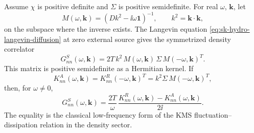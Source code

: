 \begin{theorem}
\label{thm:sk-hydro-density-fdt-from-action}
Assume \(\chi\) is positive definite and \(\Sigma\) is positive semidefinite.
For real \(\omega\), \(\mathbf k\), let
\begin{equation}
  M(\omega,\mathbf k)=
  (Dk^2-\ii\omega\mathbf 1)^{-1},
  \qquad k^2=\mathbf k\cdot\mathbf k ,
  \label{eq:sk-hydro-diffusion-resolvent}
\end{equation}
on the subspace where the inverse exists.  The Langevin equation
\eqref{eq:sk-hydro-langevin-diffusion} at zero external source gives the
symmetrized density correlator
\begin{equation}
  G^{S}_{nn}(\omega,\mathbf k)
  =
  2T\,k^2\,
  M(\omega,\mathbf k)\,
  \Sigma\,
  M(-\omega,\mathbf k)^T .
  \label{eq:sk-hydro-density-symmetrized-correlator}
\end{equation}
This matrix is positive semidefinite as a Hermitian kernel.  If
\begin{equation}
  K^A_{nn}(\omega,\mathbf k)
  =
  K^R_{nn}(-\omega,\mathbf k)^T
  =
  k^2\Sigma\,M(-\omega,\mathbf k)^T ,
  \label{eq:sk-hydro-density-advanced-kernel}
\end{equation}
then, for \(\omega\ne0\),
\begin{equation}
  G^{S}_{nn}(\omega,\mathbf k)
  =
  \frac{2T}{\omega}\,
  \frac{K^R_{nn}(\omega,\mathbf k)-K^A_{nn}(\omega,\mathbf k)}{2\ii}.
  \label{eq:sk-hydro-density-classical-fdt}
\end{equation}
The equality is the classical low-frequency form of the KMS
fluctuation--dissipation relation in the density sector.
\end{theorem}

